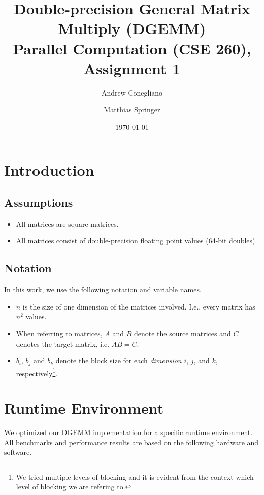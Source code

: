 \documentclass[12pt]{article}
\begin{document}
\title{Double-precision General Matrix Multiply (DGEMM)  \\ \vspace{2 mm} {\large Parallel Computation (CSE 260), Assignment 1}}
\date{\today}
\author{Andrew Conegliano \and Matthias Springer}
\maketitle

\section{Introduction}

\subsection{Assumptions}
\begin{itemize}
	\item All matrices are square matrices.
	\item All matrices consist of double-precision floating point values (64-bit doubles).
\end{itemize}

\subsection{Notation}
In this work, we use the following notation and variable names.
\begin{itemize}
	\item $n$ is the size of one dimension of the matrices involved. I.e., every matrix has $n^2$ values.
	\item When referring to matrices, $A$ and $B$ denote the source matrices and $C$ denotes the target matrix, i.e. $AB = C$.
	\item $b_i$, $b_j$ and $b_k$ denote the block size for each \emph{dimension} $i$, $j$, and $k$, respectively\footnote{We tried multiple levels of blocking and it is evident from the context which level of blocking we are refering to.}.
\end{itemize}

\section{Runtime Environment}
We optimized our DGEMM implementation for a specific runtime environment. All benchmarks and performance results are based on the following hardware and software.
\end{document}
